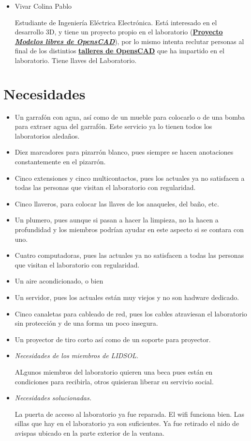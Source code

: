 \documentclass[a4paper,11pt]{article}                 %
\begin{document}
\begin{itemize}
    \item Vivar Colina Pablo
    
    Estudiante de Ingeniería Eléctrica Electrónica. Está interesado en el desarrollo 3D, y tiene un proyecto propio en el laboratorio (\href{https://github.com/LIDSOL/OpenSCAD-free-models}{\textbf{Proyecto \textit{Modelos libres de OpensCAD}}}), por lo mismo intenta reclutar personas al final de los distintios \href{https://github.com/LIDSOL/OpenSCAD-curso}{\textbf{talleres de OpensCAD}} que ha impartido en el laboratorio. Tiene llaves del Laboratorio.
  \end{itemize}
  
  \section{Necesidades}
  \begin{itemize}
    \item Un garrafón con agua, así como de un mueble para colocarlo o de una bomba para extraer agua del garrafón. Este servicio ya lo tienen todos los laboratorios aledaños.
    \item Diez marcadores para pizarrón blanco, pues siempre se hacen anotaciones constantemente en el pizarrón. 
    \item Cinco extensiones y cinco multicontactos, pues los actuales ya no satisfacen a todas las personas que visitan el laboratorio con regularidad.
    \item Cinco llaveros, para colocar las llaves de los anaqueles, del baño, etc.
    \item Un plumero, pues aunque si pasan a hacer la limpieza, no la hacen a profundidad y los miembros podrían ayudar en este aspecto si se contara con uno.
    \item Cuatro computadoras, pues las actuales ya no satisfacen a todas las personas que visitan el laboratorio con regularidad.
    \item Un aire acondicionado, o bien 
    \item Un servidor, pues los actuales están muy viejos y no son hadware dedicado.
    \item Cinco canaletas para cableado de red, pues los cables atraviesan el laboratorio sin protección y de una forma un poco insegura.
    \item Un proyector de tiro corto así como de un soporte para proyector.
    \item \textit{Necesidades de los miembros de LIDSOL.}

    ALgunos miembros del laboratorio quieren una beca pues están en condiciones para recibirla, otros quisieran liberar su servivio social.

    \item \textit{Necesidades solucionadas.}

    La puerta de acceso al laboratorio ya fue reparada. El wifi funciona bien. Las sillas que hay en el laboratorio ya son suficientes. Ya fue retirado el nido de avispas ubicado en la parte exterior de la ventana.

  \end{itemize}
\end{document}
